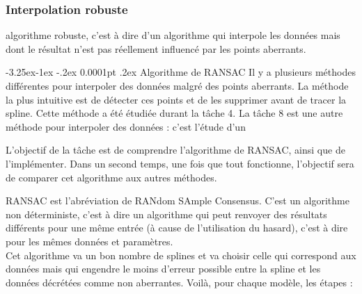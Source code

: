 \documentclass[a4paper,12pt]{article} %
\makeatletter
\renewcommand\paragraph{\@startsection{paragraph}{4}{\z@}%
                                      {-3.25ex\@plus -1ex \@minus -.2ex}%
                                      {0.0001pt \@plus .2ex}%
                                      {\normalfont\normalsize\bfseries}}
\makeatother
\begin{document}
			\subsubsection{Interpolation robuste}
        		algorithme robuste, c'est à dire d'un algorithme qui interpole les données mais dont le résultat n'est pas réellement influencé par les points aberrants.
        		
			    \paragraph{Algorithme de RANSAC}
    			    Il y a plusieurs méthodes différentes pour interpoler des données malgré des points aberrants. La méthode la plus intuitive est de détecter ces points et de les supprimer avant de tracer la spline. Cette méthode a été étudiée durant la tâche 4. La tâche 8 est une autre méthode pour interpoler des données : c'est l'étude d'un 
                    
                    L'objectif de la tâche est de comprendre l'algorithme de RANSAC, ainsi que de l'implémenter. Dans un second temps, une fois que tout fonctionne, l'objectif sera de comparer cet algorithme aux autres méthodes.
                    
                    RANSAC est l'abréviation de RANdom SAmple Consensus. C'est un algorithme non déterministe, c'est à dire un algorithme qui peut renvoyer des résultats différents pour une même entrée (à cause de l'utilisation du hasard), c'est à dire pour les mêmes données et paramètres.\\
                    Cet algorithme va un bon nombre de splines et va choisir celle qui correspond aux données mais qui engendre le moins d'erreur possible entre la spline et les données décrétées comme non aberrantes. Voilà, pour chaque modèle, les étapes :\\
                    
\end{document}
